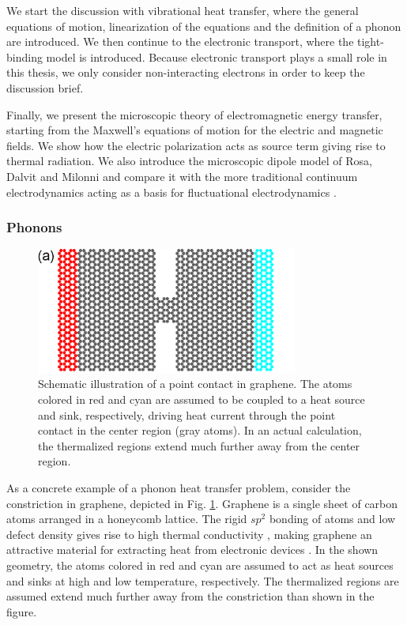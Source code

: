We start the discussion with vibrational heat transfer, where the general equations of motion, linearization of the equations and the definition of a phonon are introduced. We then continue to the electronic transport, where the tight-binding model is introduced. Because electronic transport plays a small role in this thesis, we only consider non-interacting electrons in order to keep the discussion brief. 

Finally, we present the microscopic theory of electromagnetic energy transfer, starting from the Maxwell's equations of motion for the electric and magnetic fields. We show how the electric polarization acts as source term giving rise to thermal radiation. We also introduce the microscopic dipole model of Rosa, Dalvit and Milonni \cite{rosa10,rosa11} and compare it with the more traditional continuum electrodynamics acting as a basis for fluctuational electrodynamics \cite{}. 

\subsubsection{Phonons}

\label{sec:th_phonons}

\begin{figure}
\begin{center}
 \includegraphics[width=8.6cm]{pics/gf_fig8a_2.pdf}
 \caption{Schematic illustration of a point contact in graphene. The atoms colored in red and cyan are assumed to be coupled to a heat source and sink, respectively, driving heat current through the point contact in the center region (gray atoms). In an actual calculation, the thermalized regions extend much further away from the center region.}
\label{fig:graphene_geom}
\end{center}
\end{figure} 

As a concrete example of a phonon heat transfer problem, consider the constriction in graphene, depicted in Fig. \ref{fig:graphene_geom}. Graphene is a single sheet of carbon atoms arranged in a honeycomb lattice. The rigid $sp^2$ bonding of atoms and low defect density gives rise to high thermal conductivity \cite{ghosh08,balandin11}, making graphene an attractive material for extracting heat from electronic devices \cite{yan12}. In the shown geometry, the atoms colored in red and cyan are assumed to act as heat sources and sinks at high and low temperature, respectively. The thermalized regions are assumed extend much further away from the constriction than shown in the figure. 

